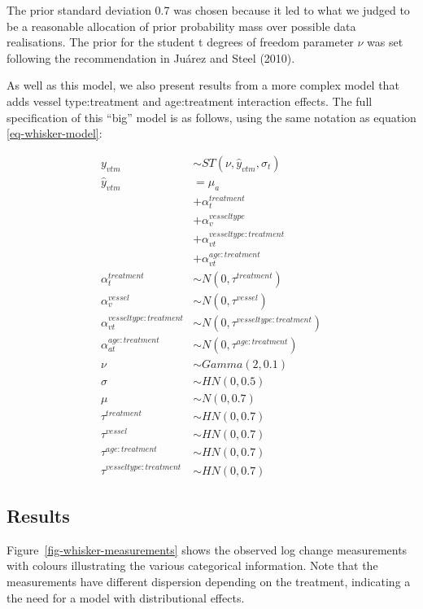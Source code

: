 \documentclass[
  letterpaper,
  DIV=11,
  numbers=noendperiod,
  oneside]{scrartcl}
\theoremstyle{plain}
\theoremstyle{remark}
\begin{document}
The prior standard deviation 0.7 was chosen because it led to what we
judged to be a reasonable allocation of prior probability mass over
possible data realisations. The prior for the student t degrees of
freedom parameter \(\nu\) was set following the recommendation in Juárez
and Steel (2010).

As well as this model, we also present results from a more complex model
that adds vessel type:treatment and age:treatment interaction effects.
The full specification of this ``big'' model is as follows, using the
same notation as equation \eqref{eq-whisker-model}:

\begin{align}
y_{vtm} &\sim ST(\nu, \hat{y}_{vtm}, \sigma_{t}) \label{eq-whisker-model-interaction} \\
\hat{y}_{vtm} &= \mu_a \nonumber \\
  &+ \alpha^{treatment}_{t} \nonumber \\
  &+ \alpha^{vesseltype}_v \nonumber \\
  &+ \alpha^{vesseltype:treatment}_{vt} \nonumber \\
  &+ \alpha^{age:treatment}_{vt} \nonumber \\
\alpha^{treatment}_t &\sim N(0, \tau^{treatment}) \nonumber \\
\alpha^{vessel}_v &\sim N(0, \tau^{vessel}) \nonumber \\
\alpha^{vesseltype:treatment}_{vt} &\sim N(0, \tau^{vesseltype:treatment}) \nonumber \\
\alpha^{age:treatment}_{at} &\sim N(0, \tau^{age:treatment}) \nonumber \\
\nu &\sim Gamma(2, 0.1) \nonumber \\
\sigma &\sim HN(0, 0.5) \nonumber \\
\mu &\sim N(0, 0.7) \nonumber \\
\tau^{treatment} &\sim HN(0, 0.7) \nonumber \\
\tau^{vessel} &\sim HN(0, 0.7) \nonumber \\
\tau^{age:treatment} &\sim HN(0, 0.7) \nonumber \\
\tau^{vesseltype:treatment} &\sim HN(0, 0.7) \nonumber 
\end{align}

\subsection{Results}\label{results}

Figure~\ref{fig-whisker-measurements} shows the observed log change
measurements with colours illustrating the various categorical
information. Note that the measurements have different dispersion
depending on the treatment, indicating a the need for a model with
distributional effects.
\end{document}
